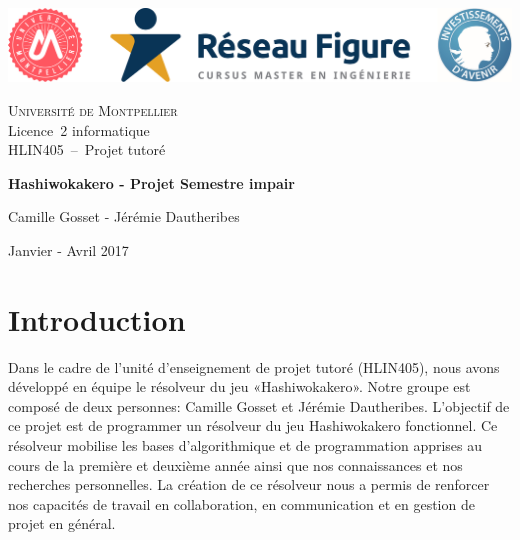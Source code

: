 \documentclass[french]{article}
\begin{document}
\begin{titlepage}
  \begin{center}
    \includegraphics[scale=0.45]{logos.png}
    \vspace{1.5cm}
    
    \textsc{\LARGE Université de Montpellier}\\
    Licence~2 informatique\\
    HLIN405~--~Projet tutoré
    
    \vfill
    

 
    { \huge \bfseries Hashiwokakero - Projet Semestre impair \\[0.4cm] }

    \vfill
    
    
    \vfill

    \begin{minipage}{0.9\textwidth}

        \center Camille Gosset - Jérémie Dautheribes       
    \end{minipage}

    \vfill

    {\large Janvier - Avril 2017}
  \end{center}
\end{titlepage}



\section{\LARGE Introduction}
\hspace{0.5cm} Dans le cadre de l'unité d'enseignement de projet tutoré (HLIN405), nous avons développé en équipe le résolveur du jeu «Hashiwokakero». Notre groupe est composé de deux personnes: Camille Gosset et Jérémie Dautheribes.
L’objectif de ce projet est  de programmer un résolveur du jeu Hashiwokakero fonctionnel. Ce résolveur mobilise les bases d’algorithmique et de programmation apprises au cours de la première et deuxième année ainsi que nos connaissances et nos recherches personnelles. La création de ce résolveur nous a permis de renforcer nos capacités de travail en collaboration, en communication et en gestion de projet en général.
\end{document}
